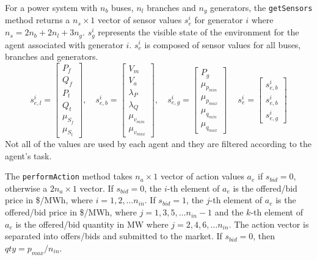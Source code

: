 %

For a power system with $n_b$ buses, $n_l$ branches and $n_g$ generators, the
\texttt{getSensors} method returns a $n_s \times 1$ vector of sensor values
$s^i_e$ for generator $i$ where $n_s = 2n_b + 2n_l + 3n_g$.  $s^i_g$ represents
the visible state of the environment for the agent associated with generator
$i$.  $s^i_e$ is composed of sensor values for all buses, branches and
generators.
\begin{equation}
s^i_{e,l} =
\begin{bmatrix}
P_f\\
Q_f\\
P_t\\
Q_t\\
\mu_{S_f}\\
\mu_{S_t}
\end{bmatrix}, \quad
s^i_{e,b} =
\begin{bmatrix}
V_m\\
V_a\\
\lambda_P\\
\lambda_Q\\
\mu_{v_{min}}\\
\mu_{v_{max}}
\end{bmatrix}, \quad
s^i_{e,g} =
\begin{bmatrix}
P_g\\
\mu_{p_{min}}\\
\mu_{p_{max}}\\
\mu_{q_{min}}\\
\mu_{q_{max}}
\end{bmatrix}\ \quad
s^i_e =
\begin{bmatrix}
s^i_{e,b}\\
s^i_{e,b}\\
s^i_{e,g}
\end{bmatrix}
\end{equation}
Not all of the values are used by each agent and they are filtered according
to the agent's task.

The \texttt{performAction} method takes $n_a \times 1$ vector of action values
$a_e$ if $s_{bid} = 0$, otherwise a $2n_a \times 1$ vector.  If $s_{bid} = 0$,
the $i$-th element of $a_e$ is the offered/bid price in \$/MWh, where
$i = 1,2,\dotsc n_{in}$.  If $s_{bid} = 1$, the $j$-th element of $a_e$ is the
offered/bid price in \$/MWh, where $j = 1,3,5,\dotsc n_{in}-1$ and the $k$-th
element of $a_e$ is the offered/bid quantity in MW where $j = 2,4,6,\dotsc
n_{in}$.  The action vector is separated into offers/bids and submitted to the
market.  If $s_{bid} = 0$, then $qty = p_{max}/n_{in}$.


